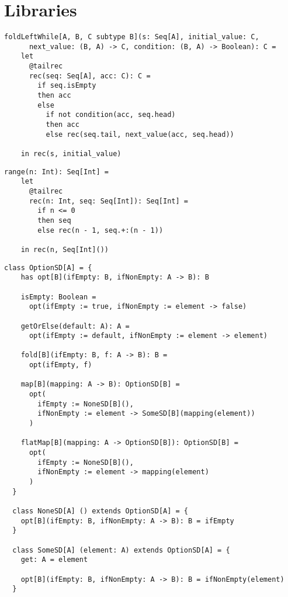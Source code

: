 \chapter{Libraries}

\begin{lstlisting}[label={lst:foldLeftWhile}]
  foldLeftWhile[A, B, C subtype B](s: Seq[A], initial_value: C,
      next_value: (B, A) -> C, condition: (B, A) -> Boolean): C =
    let
      @tailrec
      rec(seq: Seq[A], acc: C): C =
        if seq.isEmpty
        then acc
        else
          if not condition(acc, seq.head)
          then acc
          else rec(seq.tail, next_value(acc, seq.head))

    in rec(s, initial_value)
\end{lstlisting}

\begin{lstlisting}[label={lst:range}]
  range(n: Int): Seq[Int] =
    let
      @tailrec
      rec(n: Int, seq: Seq[Int]): Seq[Int] =
        if n <= 0
        then seq
        else rec(n - 1, seq.+:(n - 1))

    in rec(n, Seq[Int]())
\end{lstlisting}


\begin{lstlisting}[label={lst:option}]
  class OptionSD[A] = {
    has opt[B](ifEmpty: B, ifNonEmpty: A -> B): B

    isEmpty: Boolean =
      opt(ifEmpty := true, ifNonEmpty := element -> false)

    getOrElse(default: A): A =
      opt(ifEmpty := default, ifNonEmpty := element -> element)

    fold[B](ifEmpty: B, f: A -> B): B =
      opt(ifEmpty, f)

    map[B](mapping: A -> B): OptionSD[B] =
      opt(
        ifEmpty := NoneSD[B](),
        ifNonEmpty := element -> SomeSD[B](mapping(element))
      )

    flatMap[B](mapping: A -> OptionSD[B]): OptionSD[B] =
      opt(
        ifEmpty := NoneSD[B](),
        ifNonEmpty := element -> mapping(element)
      )
  }

  class NoneSD[A] () extends OptionSD[A] = {
    opt[B](ifEmpty: B, ifNonEmpty: A -> B): B = ifEmpty
  }

  class SomeSD[A] (element: A) extends OptionSD[A] = {
    get: A = element

    opt[B](ifEmpty: B, ifNonEmpty: A -> B): B = ifNonEmpty(element)
  }
\end{lstlisting}

